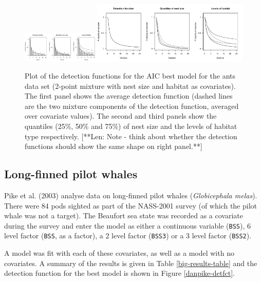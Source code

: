 \documentclass[useAMS,referee]{biom}
\begin{document}
\begin{figure}
\centering
\includegraphics[width=0.3333\textwidth, trim=0 0 5.73228347in 0, clip=true]{analyses/ants-nesthab-1.pdf}\includegraphics[width=0.6666\textwidth, trim=2.86614173in 0 0 0, clip=true]{analyses/ants-nesthab-2.pdf}
\caption{Plot of the detection functions for the AIC best model for the ants data set (2-point mixture with nest size and habitat as covariates). The first panel shows the average detection function (dashed lines are the two mixture components of the detection function, averaged over covariate values). The second and third panels show the quantiles (25\%, 50\% and 75\%) of nest size and the levels of habitat type respectively.
[**Len: Note - think about whether the detection functions should show the same shape on right panel.**] }
\label{ants-nesthab}
\end{figure}


\subsection{Long-finned pilot whales}

Pike et al. (2003) analyse data on long-finned pilot whales (\textit{Globicephala melas}). There were 84 pods sighted as part of the NASS-2001 survey (of which the pilot whale was not a target). The Beaufort sea state was recorded as a covariate during the survey and enter the model as either a continuous variable (\texttt{BSS}), 6 level factor (\texttt{BSS}, as a factor), a 2 level factor (\texttt{BSS3}) or a 3 level factor (\texttt{BSS2}).

A model was fit with each of these covariates, as well as a model with no covariates. A summary of the results is given in Table \ref{big-results-table} and the detection function for the best model is shown in Figure \ref{danpike-detfct}.
\end{document}
